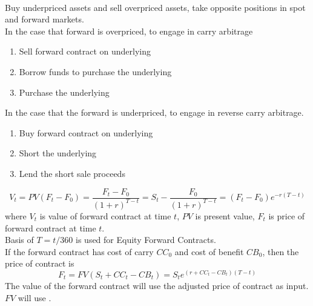 \begin{remark} \\
Buy underpriced assets and sell overpriced assets, take opposite positions in spot and forward markets.\\
In the case that forward is overpriced, to engage in carry arbitrage
\begin{enumerate}[label=\roman*.]
\setlength{\itemsep}{0pt}
\item Sell forward contract on underlying
\item Borrow funds to purchase the underlying
\item Purchase the underlying
\end{enumerate}
In the case that the forward is underpriced, to engage in reverse carry arbitrage.
\begin{enumerate}[label=\roman*.]
\setlength{\itemsep}{0pt}
\item Buy forward contract on underlying
\item Short the underlying
\item Lend the short sale proceeds
\end{enumerate}
\end{remark}

\begin{remark} 
\begin{equation}
V_t = PV(F_t - F_0) = \frac{F_t - F_0}{(1+r)^{T-t}} = S_t - \frac{F_0}{(1+r)^{T-t}} = (F_t - F_0)e^{-r(T-t)} \nonumber
\end{equation}
where $V_t$ is value of forward contract at time $t$, $PV$ is present value, $F_t$ is price of forward contract at time $t$.\\
Basis of $T = t/360$ is used for Equity Forward Contracts.\\
If the forward contract has cost of carry $CC_0$ and cost of benefit $CB_0$, then the price of contract is
\begin{equation}
F_t = FV(S_t + CC_t - CB_t) = S_t e^{(r + CC_t - CB_t)(T-t)}\nonumber
\end{equation}
The value of the forward contract will use the adjusted price of contract as input.\\
$FV$ will use .
\end{remark}

